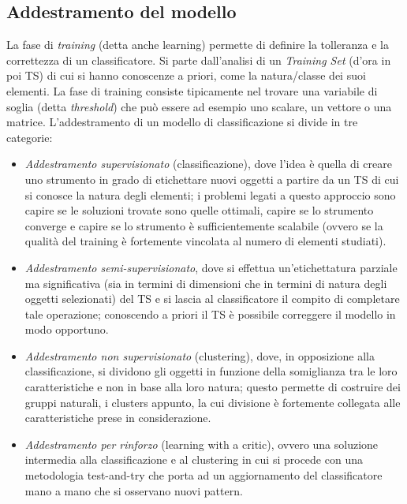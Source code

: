 \documentclass[a4paper,oneside,titlepage]{book}
\begin{document}
\subsection{Addestramento del modello}
La fase di \textit{training} (detta anche learning) permette di definire la tolleranza e la correttezza di un classificatore. Si parte dall'analisi di un \textit{Training Set} (d'ora in poi TS) di cui si hanno conoscenze a priori, come la natura/classe dei suoi elementi. La fase di training consiste tipicamente nel trovare una variabile di soglia (detta \textit{threshold}) che può essere ad esempio uno scalare, un vettore o una matrice. L'addestramento di un modello di classificazione si divide in tre categorie:
\begin{itemize}
    \item \textit{Addestramento supervisionato} (classificazione), dove l'idea è quella di creare uno strumento in grado di etichettare nuovi oggetti a partire da un TS di cui si conosce la natura degli elementi; i problemi legati a questo approccio sono capire se le soluzioni trovate sono quelle ottimali, capire se lo strumento converge e capire se lo strumento è sufficientemente scalabile (ovvero se la qualità del training è fortemente vincolata al numero di elementi studiati).
    
    \item \textit{Addestramento semi-supervisionato}, dove si effettua un'etichettatura parziale ma significativa (sia in termini di dimensioni che in termini di natura degli oggetti selezionati) del TS e si lascia al classificatore il compito di completare tale operazione; conoscendo a priori il TS è possibile correggere il modello in modo opportuno.
    
    \item \textit{Addestramento non supervisionato} (clustering), dove, in opposizione alla classificazione, si dividono gli oggetti in funzione della somiglianza tra le loro caratteristiche e non in base alla loro natura; questo permette di costruire dei gruppi naturali, i clusters appunto, la cui divisione è fortemente collegata alle caratteristiche prese in considerazione.
    
    \item \textit{Addestramento per rinforzo} (learning with a critic), ovvero una soluzione intermedia alla classificazione e al clustering in cui si procede con una metodologia test-and-try che porta ad un aggiornamento del classificatore mano a mano che si osservano nuovi pattern.
\end{itemize}
\end{document}
